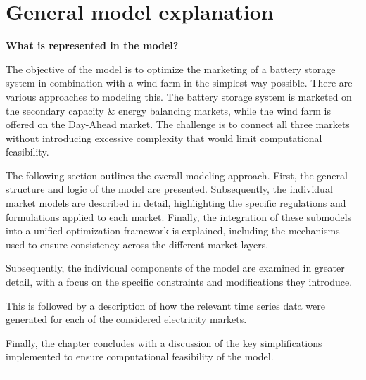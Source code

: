 \section{General model explanation}

\textbf{What is represented in the model?} \\

The objective of the model is to optimize the marketing of a battery storage system in combination with a wind farm in the simplest way possible.
There are various approaches to modeling this. The battery storage system is marketed on the secondary capacity \& energy balancing markets,
while the wind farm is offered on the Day-Ahead market.
The challenge is to connect all three markets without introducing excessive complexity that would limit computational feasibility.

The following section outlines the overall modeling approach.
First, the general structure and logic of the model are presented.
Subsequently, the individual market models are described in detail,
highlighting the specific regulations and formulations applied to each market.
Finally, the integration of these submodels into a unified optimization framework
is explained, including the mechanisms used to ensure consistency
across the different market layers. 

Subsequently, the individual components of the model are examined in greater detail,
with a focus on the specific constraints and modifications they introduce.%

This is followed by a description of how the relevant time series data
were generated for each of the considered electricity markets.

Finally, the chapter concludes with a discussion of the key simplifications
implemented to ensure computational feasibility of the model.%

\rule{\textwidth}{0.4pt}

